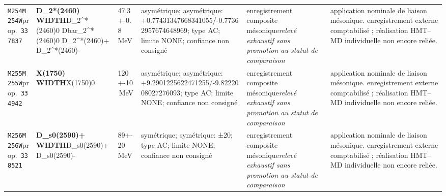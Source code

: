 \begin{landscape}
\begin{longtable}{L{1.85cm}L{4.45cm}L{2.35cm}L{4.05cm}L{3.35cm}L{7.15cm}}
\texttt{M254}\newline \texttt{M254W}\newline prop.\ \texttt{337837} & \textbf{D\_\allowbreak{}2*(2460) WIDTH}\newline D\_\allowbreak{}2\textasciicircum{}*(2460)0 \textbar{}\allowbreak{} Dbar\_\allowbreak{}2\textasciicircum{}*(2460)0 \textbar{}\allowbreak{} D\_\allowbreak{}2\textasciicircum{}*(2460)+ \textbar{}\allowbreak{} D\_\allowbreak{}2\textasciicircum{}*(2460)- & 47.3+-0.8\,MeV & asymétrique; asymétrique: +0.77431347668341055/-0.77362957674648969; type AC; limite NONE; confiance non consigné & enregistrement composite mésonique\newline \emph{relevé exhaustif sans promotion au statut de comparaison} & application nominale de liaison mésonique. enregistrement externe comptabilisé ; réalisation HMT--MD individuelle non encore reliée. \\
\texttt{M255}\newline \texttt{M255W}\newline prop.\ \texttt{334942} & \textbf{X(1750) WIDTH}\newline X(1750)0 & 120+-10\,MeV & asymétrique; asymétrique: +9.2901225622471255/-9.8222008027276093; type AC; limite NONE; confiance non consigné & enregistrement composite mésonique\newline \emph{relevé exhaustif sans promotion au statut de comparaison} & application nominale de liaison mésonique. enregistrement externe comptabilisé ; réalisation HMT--MD individuelle non encore reliée. \\
\texttt{M256}\newline \texttt{M256W}\newline prop.\ \texttt{338521} & \textbf{D\_\allowbreak{}s0(2590)+ WIDTH}\newline D\_\allowbreak{}s0(2590)+ \textbar{}\allowbreak{} D\_\allowbreak{}s0(2590)- & 89+-20\,MeV & symétrique; symétrique: ±20; type AC; limite NONE; confiance non consigné & enregistrement composite mésonique\newline \emph{relevé exhaustif sans promotion au statut de comparaison} & application nominale de liaison mésonique. enregistrement externe comptabilisé ; réalisation HMT--MD individuelle non encore reliée. \\

\end{longtable}
\end{landscape}
